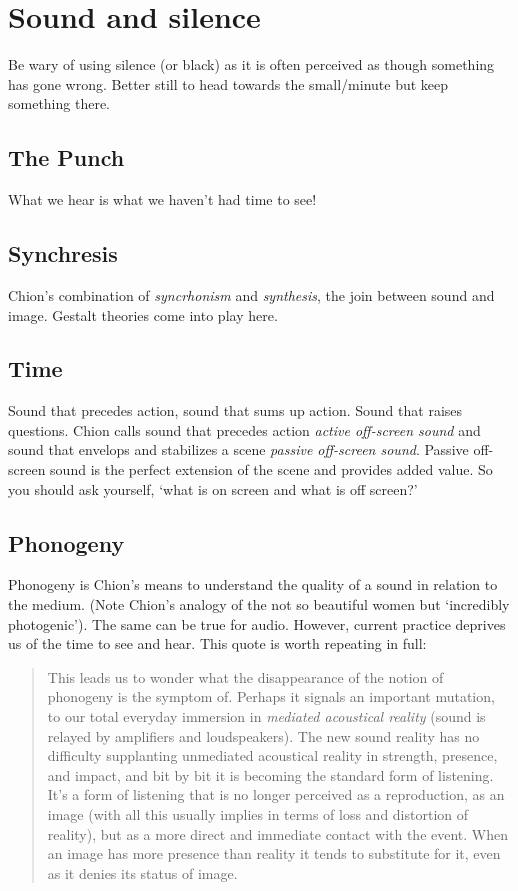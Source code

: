 \section{Sound and silence}
Be wary of using silence (or black) as it is often perceived as though something has gone wrong. Better still to head towards the small/minute but keep something there.

\subsection{The Punch}
What we hear is what we haven't had time to see! \citep[61]{chion1990}

\subsection{Synchresis}
Chion's combination of \textit{syncrhonism} and \textit{synthesis}, the join between sound and image. Gestalt theories come into play here. 

\subsection{Time}
Sound that precedes action, sound that sums up action. Sound that raises questions.
Chion calls sound that precedes action \textit{active off-screen sound} and sound that envelops and stabilizes a scene \textit{passive off-screen sound}. Passive off-screen sound is the perfect extension of the scene and provides added value.
So you should ask yourself, `what is on screen and what is off screen?'

\subsection{Phonogeny}
Phonogeny is Chion's means to understand the quality of a sound \citep[101]{chion1990} in relation to the medium. (Note Chion's analogy of the not so beautiful women but `incredibly photogenic'). The same can be true for audio. However, current practice deprives us of the time to see and hear. This quote is worth repeating in full:

\begin{quotation}
This leads us to wonder what the disappearance of the notion of phonogeny is the symptom of. Perhaps it signals an important mutation, to our total everyday immersion in \textit{mediated acoustical reality} (sound is relayed by amplifiers and loudspeakers). The new sound reality has no difficulty supplanting unmediated acoustical reality in strength, presence, and impact, and bit by bit it is becoming the standard form of listening. It's a form of listening that is no longer perceived as a reproduction, as an image (with all this usually implies in terms of loss and distortion of reality), but as a more direct and immediate contact with the event. When an image has more presence than reality it tends to substitute for it, even as it denies its status of image.

\end{quotation}

